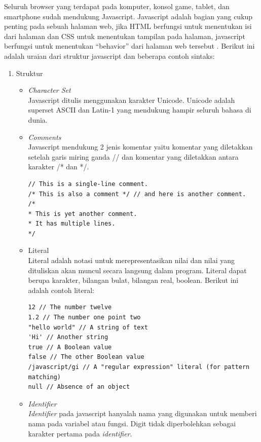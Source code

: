 Seluruh browser yang terdapat pada komputer, konsol game, tablet, dan smartphone
sudah mendukung Javascript. Javascript adalah bagian yang cukup penting pada
sebuah halaman web, jika HTML berfungsi untuk menentukan isi dari halaman dan 
CSS untuk menentukan tampilan pada halaman, javascript 
berfungsi untuk menentukan ``behavior'' dari halaman web tersebut
\cite{Flanagan:2011}.
Berikut ini adalah uraian dari struktur javascript dan beberapa contoh sintaks:
\begin{enumerate}
\item Struktur

\begin{itemize}
\item \textit{Character Set} \\
Javascript ditulis menggunakan karakter Unicode. Unicode adalah superset ASCII dan Latin-1 yang mendukung 
hampir seluruh bahasa di dunia.

\item \textit{Comments} \\
Javascript mendukung 2 jenis komentar yaitu komentar yang diletakkan setelah garis miring ganda // dan komentar yang 
diletakkan antara karakter /* dan */.
\begin{verbatim}
// This is a single-line comment.
/* This is also a comment */ // and here is another comment.
/*
* This is yet another comment.
* It has multiple lines.
*/
\end{verbatim}

\item Literal \\
Literal adalah notasi untuk merepresentasikan nilai 
dan nilai yang dituliskan akan muncul secara langsung dalam program. Literal
dapat berupa karakter, bilangan bulat, bilangan real, boolean. Berikut
ini adalah contoh literal:
\begin{verbatim}
12 // The number twelve
1.2 // The number one point two
"hello world" // A string of text
'Hi' // Another string
true // A Boolean value
false // The other Boolean value
/javascript/gi // A "regular expression" literal (for pattern matching)
null // Absence of an object 
\end{verbatim}

\item \textit{Identifier} \\
\textit{Identifier} pada javascript hanyalah nama yang digunakan untuk memberi
nama pada variabel atau fungsi. Digit tidak diperbolehkan sebagai karakter
pertama pada \textit{identifier}.


\end{itemize}
\end{enumerate}
